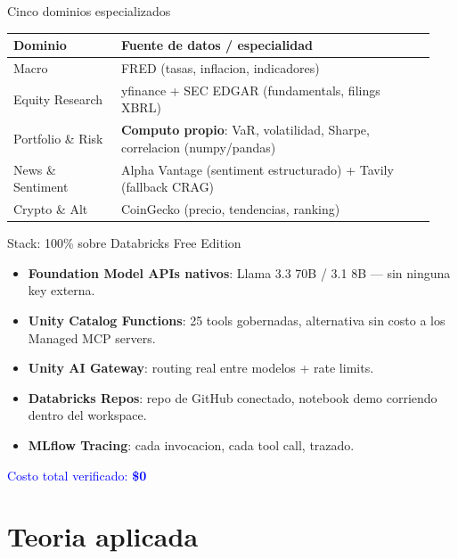 \documentclass[11pt]{beamer}
\newcommand{\hlg}[1]{\textcolor{green!50!black}{#1}}
\begin{document}
\begin{frame}{Cinco dominios especializados}
\footnotesize
\begin{tabular}{@{}p{0.24\linewidth}p{0.70\linewidth}@{}}
\toprule
\textbf{Dominio} & \textbf{Fuente de datos / especialidad} \\
\midrule
Macro & FRED (tasas, inflacion, indicadores) \\
Equity Research & yfinance + SEC EDGAR (fundamentals, filings XBRL) \\
Portfolio \& Risk & \textbf{Computo propio}: VaR, volatilidad, Sharpe, correlacion (numpy/pandas) \\
News \& Sentiment & Alpha Vantage (sentiment estructurado) + Tavily (fallback CRAG) \\
Crypto \& Alt & CoinGecko (precio, tendencias, ranking) \\
\bottomrule
\end{tabular}
\end{frame}

\begin{frame}{Stack: 100\% sobre Databricks Free Edition}
\begin{itemize}
    \item \textbf{Foundation Model APIs nativos}: Llama 3.3 70B / 3.1 8B --- \hlg{sin
    ninguna key externa}.
    \item \textbf{Unity Catalog Functions}: 25 tools gobernadas, alternativa sin costo a
    los Managed MCP servers.
    \item \textbf{Unity AI Gateway}: routing real entre modelos + rate limits.
    \item \textbf{Databricks Repos}: repo de GitHub conectado, notebook demo corriendo
    dentro del workspace.
    \item \textbf{MLflow Tracing}: cada invocacion, cada tool call, trazado.
\end{itemize}

\vspace{3mm}
\begin{center}
\textcolor{blue}{\Large Costo total verificado: \textbf{\$0}}
\end{center}
\end{frame}

\section{Teoria aplicada}
\end{document}
